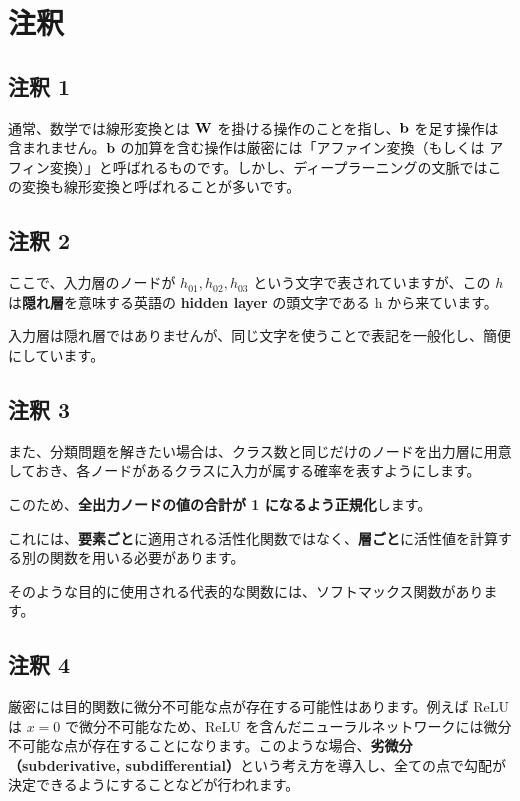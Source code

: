 \section{注釈}


\subsection{注釈 1}
\label{23-basics-of-neural-networks-note1}


通常、数学では線形変換とは ${\bf W}$ を掛ける操作のことを指し、${\bf b}$ を足す操作は含まれません。${\bf b}$ の加算を含む操作は厳密には「アファイン変換（もしくは アフィン変換）」と呼ばれるものです。しかし、ディープラーニングの文脈ではこの変換も線形変換と呼ばれることが多いです。


\subsection{注釈 2}
\label{23-basics-of-neural-networks-note2}


ここで、入力層のノードが $h_{01}, h_{02}, h_{03}$ という文字で表されていますが、この $h$ は\textbf{隠れ層}を意味する英語の \textbf{hidden layer} の頭文字である h から来ています。

入力層は隠れ層ではありませんが、同じ文字を使うことで表記を一般化し、簡便にしています。


\subsection{注釈 3}
\label{23-basics-of-neural-networks-note3}


また、分類問題を解きたい場合は、クラス数と同じだけのノードを出力層に用意しておき、各ノードがあるクラスに入力が属する確率を表すようにします。

このため、\textbf{全出力ノードの値の合計が 1 になるよう正規化}します。

これには、\textbf{要素ごと}に適用される活性化関数ではなく、\textbf{層ごと}に活性値を計算する別の関数を用いる必要があります。

    そのような目的に使用される代表的な関数には、ソフトマックス関数があります。


\subsection{注釈 4}
\label{23-basics-of-neural-networks-note4}


厳密には目的関数に微分不可能な点が存在する可能性はあります。例えば ReLU は $x = 0$ で微分不可能なため、ReLU を含んだニューラルネットワークには微分不可能な点が存在することになります。このような場合、\textbf{劣微分（subderivative, subdifferential）}という考え方を導入し、全ての点で勾配が決定できるようにすることなどが行われます。


